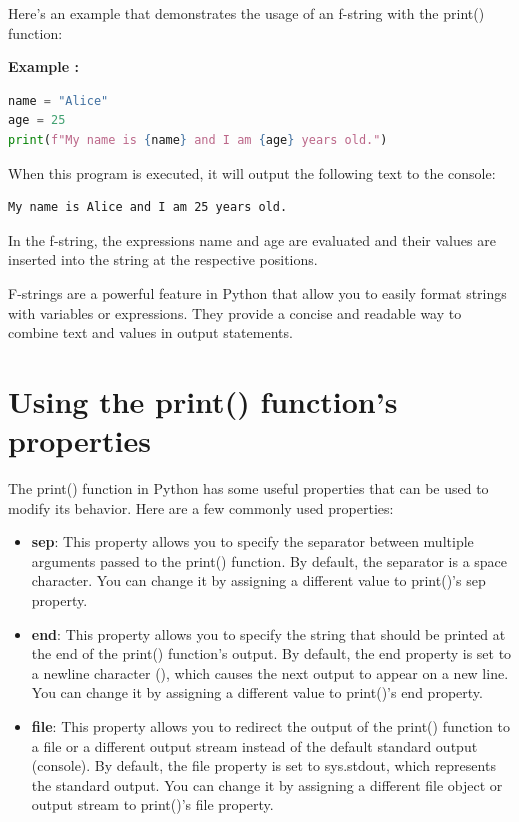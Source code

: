 \documentclass[12pt]{book}
\newtheorem{Example}{Example}[chapter]
\renewenvironment{Example}{\begin{trivlist}\item\relax
\textbf{Example \thesection: }}{\end{trivlist}}
\begin{document}
Here's an example that demonstrates the usage of an f-string with the print() function:

\begin{Example}
\begin{lstlisting}[language=Python]
name = "Alice"
age = 25
print(f"My name is {name} and I am {age} years old.")
\end{lstlisting}
\end{Example}

When this program is executed, it will output the following text to the console:

\begin{verbatim}
My name is Alice and I am 25 years old.
\end{verbatim}

In the f-string, the expressions {name} and {age} are evaluated and their values are inserted into the string at the respective positions.

F-strings are a powerful feature in Python that allow you to easily format strings with variables or expressions. They provide a concise and readable way to combine text and values in output statements.


\section{Using the print() function's properties}

The print() function in Python has some useful properties that can be used to modify its behavior. Here are a few commonly used properties:

\begin{itemize}
\item \textbf{sep}: This property allows you to specify the separator between multiple arguments passed to the print() function. By default, the separator is a space character. You can change it by assigning a different value to print()'s sep property.

\item \textbf{end}: This property allows you to specify the string that should be printed at the end of the print() function's output. By default, the end property is set to a newline character (\n), which causes the next output to appear on a new line. You can change it by assigning a different value to print()'s end property.

\item \textbf{file}: This property allows you to redirect the output of the print() function to a file or a different output stream instead of the default standard output (console). By default, the file property is set to sys.stdout, which represents the standard output. You can change it by assigning a different file object or output stream to print()'s file property.

\end{itemize}
\end{document}
